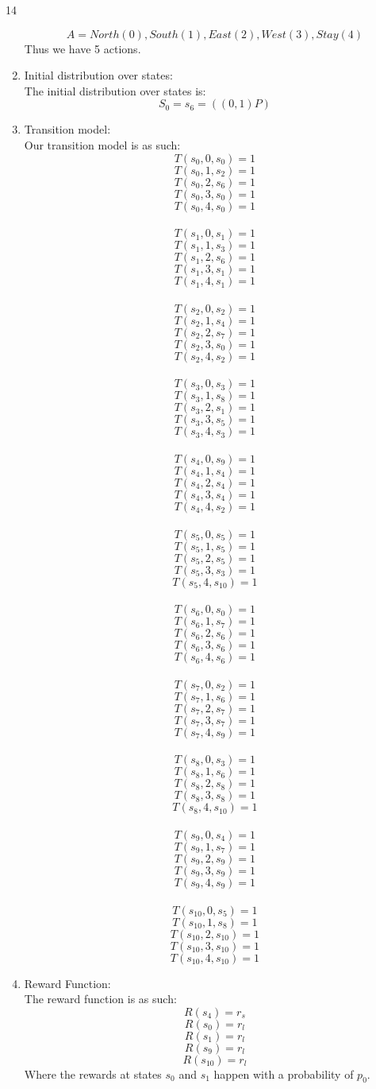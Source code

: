 14\documentclass[12pt]{article}%
\begin{document}
\begin{enumerate}
        \[ A = {North(0), South(1), East(2), West(3), Stay(4)}\]
        Thus we have 5 actions.
        \item Initial distribution over states: \\
        The initial distribution over states is:
        \[S_0 = s_6 = ((0,1) P)\]
        \item Transition model: \\
        Our transition model is as such:
        \[T(s_0, 0, s_0) = 1\]
        \[T(s_0, 1, s_2) = 1\]
        \[T(s_0, 2, s_6) = 1\]
        \[T(s_0, 3, s_0) = 1\]
        \[T(s_0, 4, s_0) = 1\]
        \\
        \[T(s_1, 0, s_1) = 1\]
        \[T(s_1, 1, s_3) = 1\]
        \[T(s_1, 2, s_6) = 1\]
        \[T(s_1, 3, s_1) = 1\]
        \[T(s_1, 4, s_1) = 1\]
        \\
        \[T(s_2, 0, s_2) = 1\]
        \[T(s_2, 1, s_4) = 1\]
        \[T(s_2, 2, s_7) = 1\]
        \[T(s_2, 3, s_0) = 1\]
        \[T(s_2, 4, s_2) = 1\]
        \\
        \[T(s_3, 0, s_3) = 1\]
        \[T(s_3, 1, s_8) = 1\]
        \[T(s_3, 2, s_1) = 1\]
        \[T(s_3, 3, s_5) = 1\]
        \[T(s_3, 4, s_3) = 1\]
        \\
        \[T(s_4, 0, s_9) = 1\]
        \[T(s_4, 1, s_4) = 1\]
        \[T(s_4, 2, s_4) = 1\]
        \[T(s_4, 3, s_4) = 1\]
        \[T(s_4, 4, s_2) = 1\]
        \\
        \[T(s_5, 0, s_5) = 1\]
        \[T(s_5, 1, s_5) = 1\]
        \[T(s_5, 2, s_5) = 1\]
        \[T(s_5, 3, s_3) = 1\]
        \[T(s_5, 4, s_10) = 1\]
        \\
        \[T(s_6, 0, s_0) = 1\]
        \[T(s_6, 1, s_7) = 1\]
        \[T(s_6, 2, s_6) = 1\]
        \[T(s_6, 3, s_6) = 1\]
        \[T(s_6, 4, s_6) = 1\]
        \\
        \[T(s_7, 0, s_2) = 1\]
        \[T(s_7, 1, s_6) = 1\]
        \[T(s_7, 2, s_7) = 1\]
        \[T(s_7, 3, s_7) = 1\]
        \[T(s_7, 4, s_9) = 1\]
        \\
        \[T(s_8, 0, s_3) = 1\]
        \[T(s_8, 1, s_6) = 1\]
        \[T(s_8, 2, s_8) = 1\]
        \[T(s_8, 3, s_8) = 1\]
        \[T(s_8, 4, s_10) = 1\]
        \\
        \[T(s_9, 0, s_4) = 1\]
        \[T(s_9, 1, s_7) = 1\]
        \[T(s_9, 2, s_9) = 1\]
        \[T(s_9, 3, s_9) = 1\]
        \[T(s_9, 4, s_9) = 1\]
        \\
        \[T(s_{10}, 0, s_5) = 1\]
        \[T(s_{10}, 1, s_8) = 1\]
        \[T(s_{10}, 2, s_10) = 1\]
        \[T(s_{10}, 3, s_10) = 1\]
        \[T(s_{10}, 4, s_10) = 1\]
    \item Reward Function: \\
    The reward function is as such:
        \[R(s_4) = r_s\]
        \[R(s_0) = r_l\]
        \[R(s_1) = r_l\]
        \[R(s_9) = r_l\]
        \[R(s_{10}) = r_l\]
    Where the rewards at states $s_0$ and $s_1$ happen with a probability of $p_0$.
    \end{enumerate}
\end{document}
